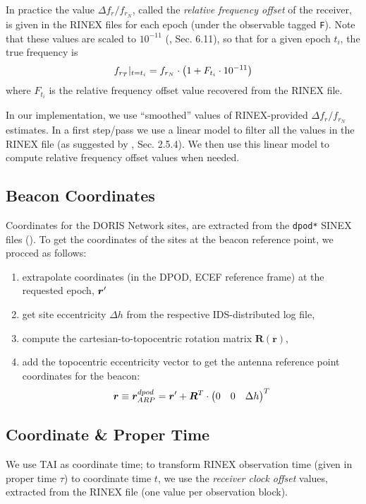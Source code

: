 In practice the value $\Delta f_r / f_{r_N}$, called the \emph{relative 
frequency offset} of the receiver, is given in the RINEX files for each epoch 
(under the observable tagged \texttt{F}). Note that these values are scaled to 
$10^{-11}$ (\cite{DORISRNX3}, Sec. 6.11), so that for a given epoch $t_i$, the 
true frequency is
\begin{equation}
  f_{r_T}|_{t=t_i} = f_{r_N} \cdot \left( 1 + F_{t_i} \cdot 10^{-11} \right)
\end{equation}
where $F_{t_i}$ is the relative frequency offset value recovered from the RINEX 
file.

In our implementation, we use ``smoothed'' values of RINEX-provided 
$\Delta f_r / f_{r_N}$ estimates. In a first step/pass we use a linear model 
to filter all the values in the RINEX file (as suggested by \cite{lemoine-2016}, 
Sec. 2.5.4). We then use this linear model to compute relative frequency offset 
values when needed. 

\subsection{Beacon Coordinates}
\label{ssec:beacon_coordinates}
Coordinates for the DORIS Network sites, are extracted from the \texttt{dpod*} 
SINEX files (\cite{Moreaux2020}). To get the coordinates of the sites at the 
beacon reference point, we procced as follows:
\begin{enumerate}
  \item extrapolate coordinates (in the DPOD, ECEF reference frame) at the 
    requested epoch, $\bm{r}\sp{\prime}$
  \item get site eccentricity $\Delta h$ from the respective IDS-distributed 
    log file,
  \item compute the cartesian-to-topocentric rotation matrix $\bm{R}(\bm{r})$,
  \item add the topocentric eccentricity vector to get the antenna reference
    point coordinates for the beacon:
    \begin{equation}
      \bm{r} \equiv \bm{r}^{dpod}_{ARP} = 
        \bm{r}\sp{\prime} + \bm{R}^T \cdot 
          \begin{pmatrix} 0 & 0 & \Delta h \end{pmatrix}^T
    \end{equation}
\end{enumerate}

\subsection{Coordinate \& Proper Time}
\label{ssec:coordinate-proper-time}
We use TAI as coordinate time; to transform RINEX observation time (given in 
proper time $\tau$) to coordinate time $t$, we use the \emph{receiver clock 
offset} values, extracted from the RINEX file (one value per observation block).

